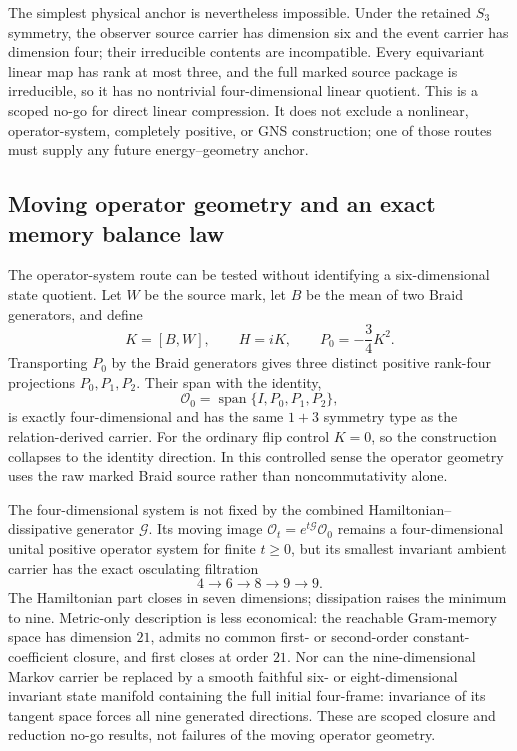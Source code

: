 \documentclass[11pt]{article}
\theoremstyle{definition}
\theoremstyle{remark}
\begin{document}
The simplest physical anchor is nevertheless impossible. Under the retained $S_3$ symmetry, the observer source carrier has dimension six and the event carrier has dimension four; their irreducible contents are incompatible. Every equivariant linear map has rank at most three, and the full marked source package is irreducible, so it has no nontrivial four-dimensional linear quotient. This is a scoped no-go for direct linear compression. It does not exclude a nonlinear, operator-system, completely positive, or GNS construction; one of those routes must supply any future energy--geometry anchor.

\subsection{Moving operator geometry and an exact memory balance law}

The operator-system route can be tested without identifying a six-dimensional state quotient. Let $W$ be the source mark, let $B$ be the mean of two Braid generators, and define
\begin{equation}
 K=[B,W],\qquad H=iK,\qquad P_0=-\frac34K^2.
\end{equation}
Transporting $P_0$ by the Braid generators gives three distinct positive rank-four projections $P_0,P_1,P_2$. Their span with the identity,
\begin{equation}
 \mathcal O_0=\operatorname{span}\{I,P_0,P_1,P_2\},
\end{equation}
is exactly four-dimensional and has the same $1+3$ symmetry type as the relation-derived carrier. For the ordinary flip control $K=0$, so the construction collapses to the identity direction. In this controlled sense the operator geometry uses the raw marked Braid source rather than noncommutativity alone.

The four-dimensional system is not fixed by the combined Hamiltonian--dissipative generator $\mathcal G$. Its moving image $\mathcal O_t=e^{t\mathcal G}\mathcal O_0$ remains a four-dimensional unital positive operator system for finite $t\ge0$, but its smallest invariant ambient carrier has the exact osculating filtration
\begin{equation}
 4\longrightarrow6\longrightarrow8\longrightarrow9\longrightarrow9.
\end{equation}
The Hamiltonian part closes in seven dimensions; dissipation raises the minimum to nine. Metric-only description is less economical: the reachable Gram-memory space has dimension $21$, admits no common first- or second-order constant-coefficient closure, and first closes at order $21$. Nor can the nine-dimensional Markov carrier be replaced by a smooth faithful six- or eight-dimensional invariant state manifold containing the full initial four-frame: invariance of its tangent space forces all nine generated directions. These are scoped closure and reduction no-go results, not failures of the moving operator geometry.
\end{document}
